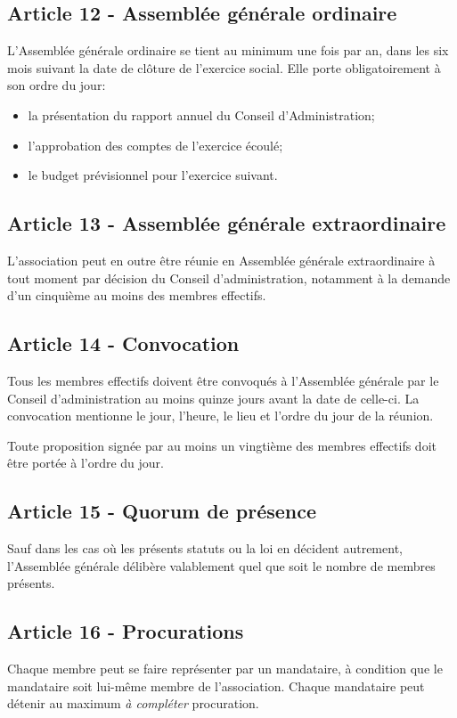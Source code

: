 \documentclass[12pt]{article}
\begin{document}
\subsection*{Article 12 - Assemblée générale ordinaire}
L'Assemblée générale ordinaire se tient au minimum une fois par an, dans les six mois suivant la date de clôture de l'exercice social. Elle porte obligatoirement à son ordre du jour:
\begin{itemize}
\item la présentation du rapport annuel du Conseil d'Administration;
\item l'approbation des comptes de l'exercice écoulé;
\item le budget prévisionnel pour l'exercice suivant.
\end{itemize}

\subsection*{Article 13 - Assemblée générale extraordinaire}
L'association peut en outre être réunie en Assemblée générale extraordinaire à tout moment par décision du Conseil d'administration, notamment à la demande d'un cinquième au moins des membres effectifs.
\subsection*{Article 14 - Convocation}
Tous les membres effectifs doivent être convoqués à l'Assemblée générale par le Conseil d'administration au moins quinze jours avant la date de celle-ci. La convocation mentionne le jour, l'heure, le lieu et l'ordre du jour de la réunion.

Toute proposition signée par au moins un vingtième des membres effectifs doit être portée à l'ordre du jour.

\subsection*{Article 15 - Quorum de présence}
Sauf dans les cas où les présents statuts ou la loi en décident autrement, l'Assemblée générale délibère valablement quel que soit le nombre de membres présents.
\subsection*{Article 16 - Procurations}
Chaque membre peut se faire représenter par un mandataire, à condition que le mandataire soit lui-même membre de l'association. Chaque mandataire peut détenir au maximum \emph{à compléter} procuration.
\end{document}

